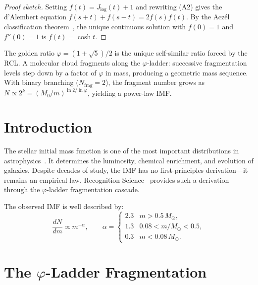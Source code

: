 \documentclass[12pt,a4paper]{article}
\theoremstyle{definition}
\theoremstyle{remark}
\begin{document}
\begin{proof}[Proof sketch]
Setting $f(t) = J_{\log}(t) + 1$ and rewriting \textup{(A2)} gives the
d'Alembert equation $f(s+t) + f(s-t) = 2f(s)f(t)$.  By the Acz\'el
classification theorem~\cite{Aczel1966}, the unique continuous solution
with $f(0) = 1$ and $f''(0) = 1$ is $f(t) = \cosh t$.
\end{proof}

\noindent The golden ratio $\varphi = (1+\sqrt{5})/2$ is the unique
self-similar ratio forced by the RCL.  A molecular cloud fragments along
the $\varphi$-ladder: successive fragmentation levels step down by a factor
of $\varphi$ in mass, producing a geometric mass sequence.  With binary
branching ($N_{\mathrm{frag}} = 2$), the fragment number grows as
$N \propto 2^k = (M_0/m)^{\ln 2/\ln\varphi}$, yielding a power-law IMF.

\section{Introduction}
\label{sec:intro}

The stellar initial mass function is one of the most important
distributions in astrophysics~\cite{Salpeter1955}.  It determines
the luminosity, chemical enrichment, and evolution of galaxies.
Despite decades of study, the IMF has no first-principles
derivation---it remains an empirical law.  Recognition
Science~\cite{RS_Axioms} provides such a derivation through the
$\varphi$-ladder fragmentation cascade.

The observed IMF is well described by:
\begin{equation}
  \frac{dN}{dm} \propto m^{-\alpha}, \qquad
  \alpha = \begin{cases}
    2.3 & m > 0.5\,M_\odot, \\
    1.3 & 0.08 < m/M_\odot < 0.5, \\
    0.3 & m < 0.08\,M_\odot.
  \end{cases}
\end{equation}

\section{The $\varphi$-Ladder Fragmentation}
\label{sec:fragmentation}
\end{document}
